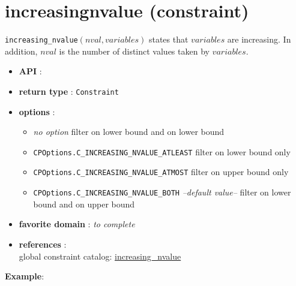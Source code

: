 \label{increasingnvalue}
\hypertarget{increasingnvalue}{}

\section{increasingnvalue (constraint)}\label{increasingnvalue:increasingnvalueconstraint}\hypertarget{increasingnvalue:increasingnvalueconstraint}{}
\begin{notedef}
  \texttt{increasing\_nvalue}$(nval, variables)$ states that $variables$ are increasing. In addition, $nval$ is the number of distinct values taken by $variables$.
\end{notedef}

\begin{itemize}
	\item \textbf{API} : 
	\item \textbf{return type} : \texttt{Constraint}
	\item \textbf{options} :
	\begin{itemize}
		\item \emph{no option} filter on lower bound and on lower bound
		\item \texttt{CPOptions.C_INCREASING_NVALUE_ATLEAST} filter on lower bound only
		\item \texttt{CPOptions.C_INCREASING_NVALUE_ATMOST} filter on upper bound only
		\item \texttt{CPOptions.C_INCREASING_NVALUE_BOTH} \textit{--default value--} filter on lower bound and on upper bound
	\end{itemize}
	\item \textbf{favorite domain} : \emph{to complete}
	\item \textbf{references} :\\
      global constraint catalog: \href{http://www.emn.fr/x-info/sdemasse/gccat/Cincreasing_nvalue.html}{increasing\_nvalue}
\end{itemize}

\textbf{Example}:
 
